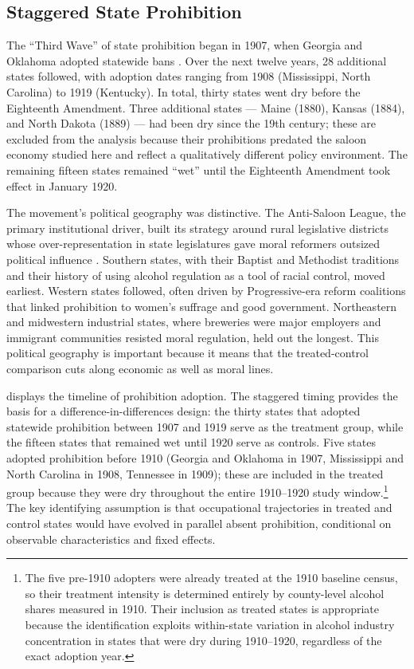 \documentclass[12pt]{article}
\begin{document}
\subsection{Staggered State Prohibition}

The ``Third Wave'' of state prohibition began in 1907, when Georgia and Oklahoma adopted statewide bans \citep{beienburg2020}. Over the next twelve years, 28 additional states followed, with adoption dates ranging from 1908 (Mississippi, North Carolina) to 1919 (Kentucky). In total, thirty states went dry before the Eighteenth Amendment. Three additional states --- Maine (1880), Kansas (1884), and North Dakota (1889) --- had been dry since the 19th century; these are excluded from the analysis because their prohibitions predated the saloon economy studied here and reflect a qualitatively different policy environment. The remaining fifteen states remained ``wet'' until the Eighteenth Amendment took effect in January 1920.

The movement's political geography was distinctive. The Anti-Saloon League, the primary institutional driver, built its strategy around rural legislative districts whose over-representation in state legislatures gave moral reformers outsized political influence \citep{mcgirr2011}. Southern states, with their Baptist and Methodist traditions and their history of using alcohol regulation as a tool of racial control, moved earliest. Western states followed, often driven by Progressive-era reform coalitions that linked prohibition to women's suffrage and good government. Northeastern and midwestern industrial states, where breweries were major employers and immigrant communities resisted moral regulation, held out the longest. This political geography is important because it means that the treated-control comparison cuts along economic as well as moral lines.

 displays the timeline of prohibition adoption. The staggered timing provides the basis for a difference-in-differences design: the thirty states that adopted statewide prohibition between 1907 and 1919 serve as the treatment group, while the fifteen states that remained wet until 1920 serve as controls. Five states adopted prohibition before 1910 (Georgia and Oklahoma in 1907, Mississippi and North Carolina in 1908, Tennessee in 1909); these are included in the treated group because they were dry throughout the entire 1910--1920 study window.\footnote{The five pre-1910 adopters were already treated at the 1910 baseline census, so their treatment intensity is determined entirely by county-level alcohol shares measured in 1910. Their inclusion as treated states is appropriate because the identification exploits within-state variation in alcohol industry concentration in states that were dry during 1910--1920, regardless of the exact adoption year.} The key identifying assumption is that occupational trajectories in treated and control states would have evolved in parallel absent prohibition, conditional on observable characteristics and fixed effects.
\end{document}
